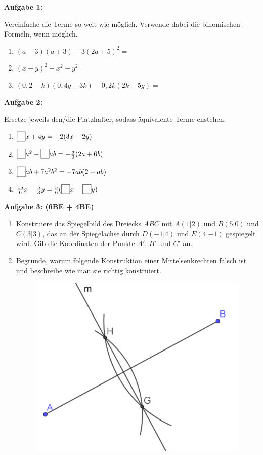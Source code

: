 \documentclass[a4paper,12pt]{article}
\newcommand{\Aufgabe}[1]{
  {
  \vspace*{0.5cm}
  \textsf{\textbf{Aufgabe #1}}
  \vspace*{0.2cm}
  
  }
}
\newcommand*{\quadratbox}{\textbf{\fbox{\phantom{?}}}}%
\begin{document}
\vspace{5cm}

\newpage


\Aufgabe{1:}
Vereinfache die Terme so weit wie möglich. Verwende dabei die binomischen
Formeln, wenn möglich.

\begin{enumerate}[label={\alph*)}]
  \item $(a-3)(a+3) -3(2a+5)^2=$
    \vspace{30mm}
  \item $(x-y)^2 + x^2-y^2 =$
    \vspace{30mm}
  \item $(0,2-k)(0,4g+3k)-0,2k(2k-5g)=$
    \vspace{30mm}
\end{enumerate}

\Aufgabe{2: }

Ersetze jeweils den/die Platzhalter, sodass äquivalente Terme enstehen.

\begin{enumerate}[label={\alph*)}]
  \item $\quadratbox x+4y=-2(3x-2y)$
  \item $\quadratbox a^2-\quadratbox ab = - \frac{a}{3}(2a+6b)$
  \item $\quadratbox ab + 7a^2b^2=-7ab(2-ab)$
  \item $\frac{15}{6}x-\frac{5}{3}y=\frac{5}{6}(\quadratbox x - \quadratbox y)$
\end{enumerate}

\newpage
\Aufgabe{3: (6BE + 4BE)}
\begin{enumerate}[label={\alph*)}]
  \item Konstruiere das Spiegelbild des Dreiecks $ABC$ mit $A(1|2)$ und $B(5|0)$ und $C(3|3)$, das an der Spiegelachse durch $D(-1|4)$ und $E(4|-1)$ gespiegelt wird. 
    Gib die Koordinaten der Punkte $A'$, $B'$ und $C'$ an.
\vspace{50mm}
\item Begründe, warum folgende Konstruktion einer Mittelsenkrechten falsch ist und \underline{beschreibe} wie man sie richtig konstruiert.
  \begin{figure}[H]
    \centering
    \includegraphics[width=0.5\linewidth]{7G_2SA_image1.png}
  \end{figure}
\end{enumerate}
\end{document}
